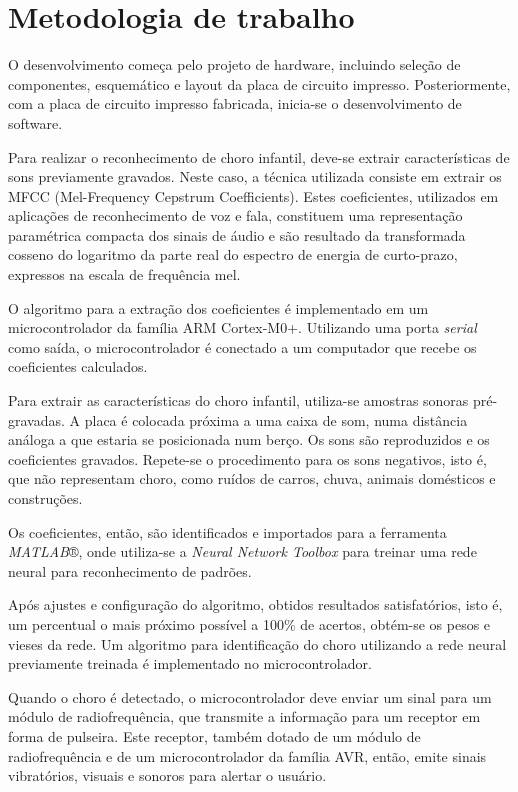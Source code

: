 \documentclass[a4paper, 12pt]{article}
\begin{document}
		
		
		
		
		
		
		\newpage
	\section{Metodologia de trabalho}
		O desenvolvimento começa pelo projeto de hardware, incluindo seleção de componentes, esquemático e layout da placa de circuito impresso. Posteriormente, com a placa de circuito impresso fabricada, inicia-se o desenvolvimento de software.
		
		Para realizar o reconhecimento de choro infantil, deve-se extrair características de sons previamente gravados. Neste caso, a técnica utilizada consiste em extrair os MFCC (Mel-Frequency Cepstrum Coefficients).
		Estes coeficientes, utilizados em aplicações de reconhecimento de voz e fala, constituem uma representação paramétrica compacta dos sinais de áudio e são resultado da transformada cosseno do logaritmo da parte real do espectro de energia de curto-prazo, expressos na escala de frequência mel. \cite{mfcc_implementation}
		
		O algoritmo para a extração dos coeficientes é implementado em um microcontrolador da família ARM Cortex-M0+. Utilizando uma porta \textit{serial} como saída, o microcontrolador é conectado a um computador que recebe os coeficientes calculados.
		
		Para extrair as características do choro infantil, utiliza-se amostras sonoras pré-gravadas. A placa é colocada próxima a uma caixa de som, numa distância análoga a que estaria se posicionada num berço. Os sons são reproduzidos e os coeficientes gravados.
		Repete-se o procedimento para os sons negativos, isto é, que não representam choro, como ruídos de carros, chuva, animais domésticos e construções.
		
		Os coeficientes, então, são identificados e importados para a ferramenta \textit{MATLAB}®, onde utiliza-se a \textit{Neural Network Toolbox} para treinar uma rede neural para reconhecimento de padrões. 
		
		Após ajustes e configuração do algoritmo, obtidos resultados satisfatórios, isto é, um percentual o mais próximo possível a 100\% de acertos, obtém-se os pesos e vieses da rede. Um algoritmo para identificação do choro utilizando a rede neural previamente treinada é implementado no microcontrolador.
		
		Quando o choro é detectado, o microcontrolador deve enviar um sinal para um módulo de radiofrequência, que transmite a informação para um receptor em forma de pulseira. Este receptor, também dotado de um módulo de radiofrequência e de um microcontrolador da família AVR, então, emite sinais vibratórios, visuais e sonoros para alertar o usuário.
	\newpage
\end{document}
